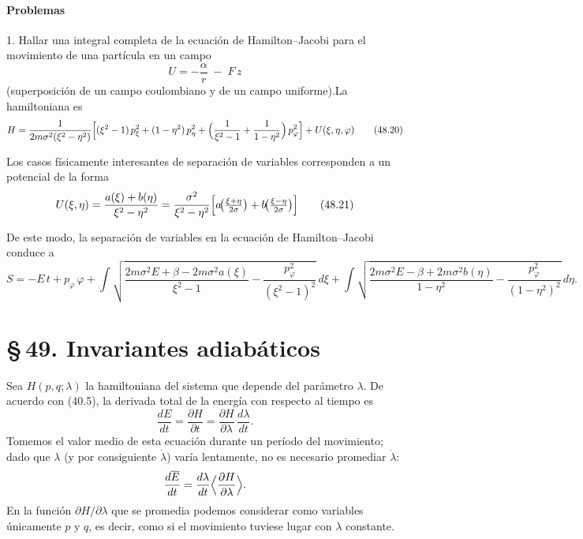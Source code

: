 \documentclass[12pt]{article}
\begin{document}
\paragraph*{Problemas}

1. Hallar una integral completa de la ecuación de Hamilton–Jacobi para el movimiento de una partícula en un campo  
\[
U = -\frac{\alpha}{r}\;-\;F\,z
\]
(superposición de un campo coulombiano y de un campo uniforme).\noindent La hamiltoniana es
\begin{equation}
H = \frac{1}{2m\sigma^{2}(\xi^{2}-\eta^{2})}
\Bigl[
(\xi^{2}-1)\,p_{\xi}^{2} + (1-\eta^{2})\,p_{\eta}^{2}
+ \Bigl(\frac{1}{\xi^{2}-1} + \frac{1}{1-\eta^{2}}\Bigr)\,p_{\varphi}^{2}
\Bigr]
+ U(\xi,\eta,\varphi)
\tag{48.20}
\end{equation}

\noindent Los casos físicamente interesantes de separación de variables corresponden a un potencial de la forma
\begin{equation}
U(\xi,\eta)
= \frac{a(\xi)+b(\eta)}{\xi^{2}-\eta^{2}}
= \frac{\sigma^{2}}{\xi^{2}-\eta^{2}}
\Bigl[
a\!\bigl(\tfrac{\xi+\eta}{2\sigma}\bigr)
+ b\!\bigl(\tfrac{\xi-\eta}{2\sigma}\bigr)
\Bigr]
\tag{48.21}
\end{equation}

\noindent De este modo, la separación de variables en la ecuación de Hamilton–Jacobi conduce a
\begin{equation}
S = -E\,t + p_{\varphi}\,\varphi
+ \int 
\sqrt{
\frac{2m\sigma^{2}E + \beta - 2m\sigma^{2}a(\xi)}{\xi^{2}-1}
- \frac{p_{\varphi}^{2}}{(\xi^{2}-1)^{2}}
}
\,d\xi
+ \int 
\sqrt{
\frac{2m\sigma^{2}E - \beta + 2m\sigma^{2}b(\eta)}{1-\eta^{2}}
- \frac{p_{\varphi}^{2}}{(1-\eta^{2})^{2}}
}
\,d\eta.
\tag{48.22}
\end{equation}

\section*{\S\,49. Invariantes adiabáticos}

\noindent Sea \(H(p,q;\lambda)\) la hamiltoniana del sistema que depende del parámetro \(\lambda\). De acuerdo con (40.5), la derivada total de la energía con respecto al tiempo es
\[
\frac{dE}{dt}
=
\frac{\partial H}{\partial t}
=
\frac{\partial H}{\partial \lambda}\,\frac{d\lambda}{dt}.
\]
Tomemos el valor medio de esta ecuación durante un período del movimiento; dado que \(\lambda\) (y por consiguiente \(\dot\lambda\)) varía lentamente, no es necesario promediar \(\dot\lambda\):
\[
\frac{d\overline E}{dt}
=
\frac{d\lambda}{dt}\Bigl\langle\frac{\partial H}{\partial \lambda}\Bigr\rangle.
\]
En la función \(\partial H/\partial\lambda\) que se promedia podemos considerar como variables únicamente \(p\) y \(q\), es decir, como si el movimiento tuviese lugar con \(\lambda\) constante.
\end{document}
